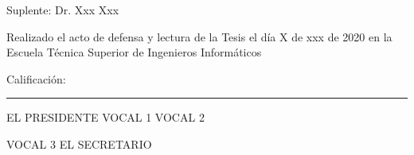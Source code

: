 \documentclass[twoside,11pt]{Latex/Classes/PhDthesisPSnPDF}
\begin{document}
\vspace{5mm}
Suplente: \hspace{1.5mm} Dr. Xxx Xxx

\vspace{10mm}
\noindent Realizado el acto de defensa y lectura de la Tesis el d\'{i}a X de xxx de 2020 en la Escuela T\'ecnica Superior de Ingenieros Inform\'aticos

\vspace{5mm}
\noindent Calificaci\'{o}n: \rule{123mm}{0.2mm}
\vspace{20mm}

EL PRESIDENTE \hspace{30mm} VOCAL 1 \hspace{30mm} VOCAL 2

\vspace{30mm}
\hspace{15mm} VOCAL 3 \hspace{45mm} EL SECRETARIO

%




\cleardoublepage


\cleardoublepage



\cleardoublepage


\cleardoublepage
\setcounter{secnumdepth}{3} %
\setcounter{tocdepth}{3}    %

\tableofcontents           %




\listoffigures	%
\end{document}
